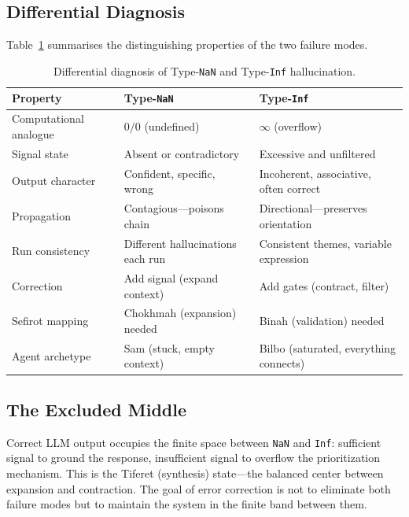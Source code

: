 \documentclass[11pt]{article}
\theoremstyle{definition}
\theoremstyle{remark}
\newcommand{\NaN}{\texttt{NaN}}
\newcommand{\Inf}{\texttt{Inf}}
\begin{document}
\subsection{Differential Diagnosis}
\label{sec:differential}

Table~\ref{tab:differential} summarises the distinguishing properties of the two
failure modes.

\begin{table}[ht]
\centering
\caption{Differential diagnosis of Type-\NaN{} and Type-\Inf{} hallucination.}
\label{tab:differential}
\begin{tabular}{@{}lll@{}}
\toprule
\textbf{Property} & \textbf{Type-\NaN{}} & \textbf{Type-\Inf{}} \\
\midrule
Computational analogue   & $0/0$ (undefined)            & $\infty$ (overflow)          \\
Signal state             & Absent or contradictory      & Excessive and unfiltered     \\
Output character         & Confident, specific, wrong   & Incoherent, associative, often correct \\
Propagation              & Contagious---poisons chain   & Directional---preserves orientation \\
Run consistency          & Different hallucinations each run & Consistent themes, variable expression \\
Correction               & Add signal (expand context)  & Add gates (contract, filter) \\
Sefirot mapping          & Chokhmah (expansion) needed  & Binah (validation) needed    \\
Agent archetype          & Sam (stuck, empty context)   & Bilbo (saturated, everything connects) \\
\bottomrule
\end{tabular}
\end{table}

\subsection{The Excluded Middle}
\label{sec:excluded-middle}

Correct LLM output occupies the finite space between \NaN{} and \Inf{}: sufficient
signal to ground the response, insufficient signal to overflow the prioritization
mechanism.  This is the Tiferet (synthesis) state---the balanced center between
expansion and contraction.  The goal of error correction is not to eliminate both
failure modes but to maintain the system in the finite band between them.
\end{document}
